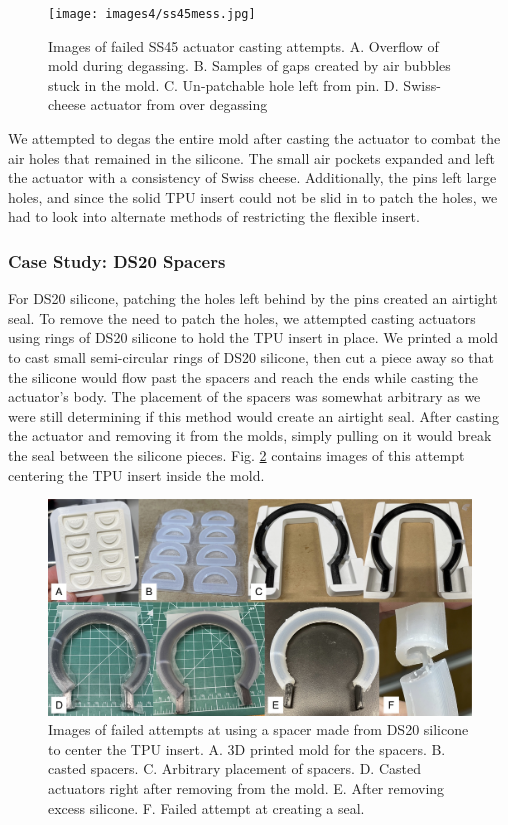 \begin{figure}[ht]
    \centering
    \texttt{[image: images4/ss45mess.jpg]}
    \caption{Images of failed SS45 actuator casting attempts. A. Overflow of mold during degassing. B. Samples of gaps created by air bubbles stuck in the mold. C. Un-patchable hole left from pin. D. Swiss-cheese actuator from over degassing}
    \label{fig:ss45mess}
\end{figure}

We attempted to degas the entire mold after casting the actuator to combat the air holes that remained in the silicone. The small air pockets expanded and left the actuator with a consistency of Swiss cheese. Additionally, the pins left large holes, and since the solid TPU insert could not be slid in to patch the holes, we had to look into alternate methods of restricting the flexible insert. 

\clearpage
\subsubsection{Case Study: DS20 Spacers}
For DS20 silicone, patching the holes left behind by the pins created an airtight seal. To remove the need to patch the holes, we attempted casting actuators using rings of DS20 silicone to hold the TPU insert in place. We printed a mold to cast small semi-circular rings of DS20 silicone, then cut a piece away so that the silicone would flow past the spacers and reach the ends while casting the actuator's body. The placement of the spacers was somewhat arbitrary as we were still determining if this method would create an airtight seal. After casting the actuator and removing it from the molds, simply pulling on it would break the seal between the silicone pieces. Fig. \ref{fig:ds20spacer} contains images of this attempt centering the TPU insert inside the mold. 

\begin{figure}[ht]
    \centering
    \includegraphics[width=6 in]{images4/ds20spacer.jpg}
    \caption{Images of failed attempts at using a spacer made from DS20 silicone to center the TPU insert. A. 3D printed mold for the spacers. B. casted spacers. C. Arbitrary placement of spacers. D. Casted actuators right after removing from the mold. E. After removing excess silicone. F. Failed attempt at creating a seal.}
    \label{fig:ds20spacer}
\end{figure}

